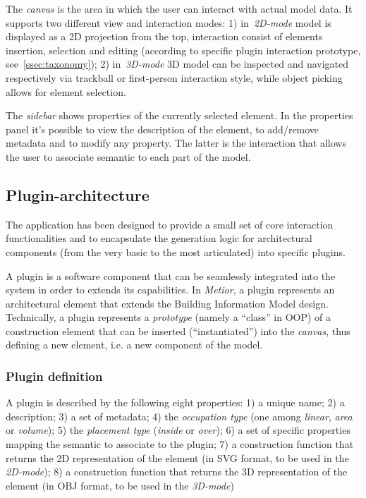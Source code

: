 \noindent The \emph{canvas} is the area in which the user can interact with actual model data. It supports two different view and interaction modes: 1) in~\emph{2D-mode} model is displayed as a 2D projection from the top, interaction consist of elements insertion, selection and editing (according to specific plugin interaction prototype, see~\ref{ssec:taxonomy}); 2) in~\emph{3D-mode} 3D model can be inspected and navigated respectively via trackball or first-person interaction style, while object picking allows for element selection.

\noindent The \emph{sidebar} shows properties of the currently selected element.
In the properties panel it's possible to view the description of the element, to add/remove metadata and to modify any property. The latter is the interaction that allows the user to associate semantic to each part of the model.

\subsection{Plugin-architecture}

\noindent The application has been designed to provide a small set of core interaction functionalities and to encapsulate the generation logic for architectural components (from the very basic to the most articulated) into specific plugins.

\noindent A plugin is a software component that can be seamlessly integrated into the system in order to extends its capabilities.
In \emph{Metior}, a plugin represents an architectural element that extends the Building Information Model design.
Technically, a plugin represents a \emph{prototype} (namely a ``class'' in OOP) of a construction element that can be inserted (``instantiated'') into the \emph{canvas}, thus defining a new element, i.e. a new component of the model.

\subsubsection{Plugin definition}

A plugin is described by the following eight properties: 1) a unique name; 2) a description; 3) a set of metadata; 4) the \emph{occupation type} (one among \emph{linear}, \emph{area} or \emph{volume}); 5) the \emph{placement type} (\emph{inside} or \emph{over}); 6) a set of specific properties mapping the semantic to associate to the plugin; 7) a construction function that returns the 2D representation of the element (in SVG format, to be used in the \emph{2D-mode}); 8) a construction function that returns the 3D representation of the element (in OBJ format, to be used in the \emph{3D-mode})

